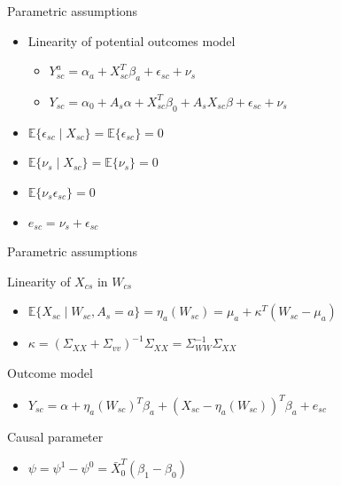 \documentclass[hyperref={pdfpagelabels=false}]{beamer}
\begin{document}
\begin{frame}{Parametric assumptions}
    \begin{itemize}
        \item Linearity of potential outcomes model \bigskip
        \begin{itemize}
            \item $Y^a_{sc} = \alpha_a + X_{sc}^T\beta_a + \epsilon_{sc} + \nu_s$ \bigskip
            \item $Y_{sc} = \alpha_0 + A_s \alpha + X_{sc}^T\beta_0 + A_sX_{sc}\beta + \epsilon_{sc} + \nu_s$ \bigskip
        \end{itemize}
        \item $\mathbb{E}\{\epsilon_{sc} \mid X_{sc}\} = \mathbb{E}\{\epsilon_{sc}\} = 0$ \bigskip
        \item $\mathbb{E}\{\nu_s \mid X_{sc}\} = \mathbb{E}\{\nu_s\} = 0$ \bigskip
        \item $\mathbb{E}\{\nu_s \epsilon_{sc}\} = 0$ \bigskip
        \item $e_{sc} = \nu_s + \epsilon_{sc}$
    \end{itemize}
\end{frame}

\begin{frame}{Parametric assumptions}
        \item Linearity of $X_{cs}$ in $W_{cs}$ \bigskip 
        \begin{itemize}
            \item $\mathbb{E}\{X_{sc} \mid W_{sc}, A_s = a\} = \eta_a(W_{sc}) = \mu_a + \kappa^T(W_{sc} - \mu_a)$ \bigskip
            \item $\kappa = (\Sigma_{XX} + \Sigma_{vv})^{-1}\Sigma_{XX} = \Sigma_{WW}^{-1}\Sigma_{XX}$ \bigskip
        \end{itemize}
        \item Outcome model \bigskip
        \begin{itemize}
            \item $Y_{sc} = \alpha + \eta_a(W_{sc})^T\beta_a + (X_{sc} - \eta_a(W_{sc}))^T\beta_a + e_{sc}$ \bigskip
        \end{itemize}
        \item Causal parameter \bigskip
        \begin{itemize}
            \item $\psi = \psi^1 - \psi^0 = \bar{X}_0^T(\beta_1 - \beta_0)$
        \end{itemize}
\end{frame}
\end{document}

